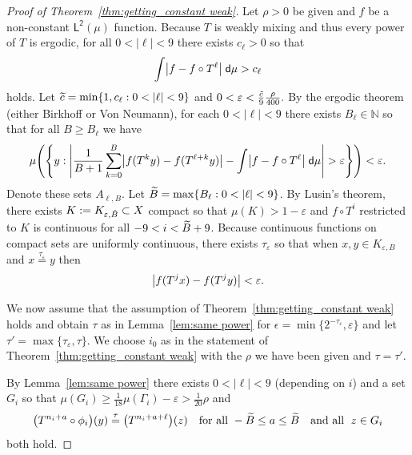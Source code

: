 \documentclass[10pt]{amsart}
\theoremstyle{definition}\newtheorem{defi}[theo]{Definition}\newtheorem{rema}[theo]{Remark}\newtheorem{exam}[theo]{Example}\newtheorem{exem}[theo]{Example}\newtheorem{nota}[theo]{Notation}
\newcommand{\N}{\mathbb{N}}
\newcommand{\intd}{\;\mathsf{d}}
\newcommand{\lp}{\mathsf{L}}
\newcommand{\ltwo}{\lp^{\!\mathsf{2}}}
\let\originalleft\left
\let\originalright\right
\renewcommand{\left}{\mathopen{}\mathclose\bgroup\originalleft}
\renewcommand{\right}{\aftergroup\egroup\originalright}
\let\oldtilde\tilde
\renewcommand*{\tilde}[1]{\mathchoice{\widetilde{#1}}{\widetilde{#1}}{\oldtilde{#1}}{\oldtilde{#1}}}
\begin{document}
\begin{proof}[Proof of Theorem~\ref{thm:getting_constant weak}]
Let $\rho>0$ be given and $f$ be a non-constant $\ltwo(\mu)$ function. Because $T$ is weakly mixing and thus every power of $T$ is ergodic, for all $0<|\ell|<9$ there exists $c_\ell>0$ so that
\[
\int \left|f-f\circ T^\ell\right| \intd \mu>c_\ell
\]
holds. Let $\tilde{c}=\min\{1,c_\ell:0<|\ell|<9\}$ and $0<\varepsilon<\frac{\tilde{c}}9 \frac{\rho}{400}.$ By the ergodic theorem (either Birkhoff or Von Neumann), for each $0<|\ell|<9$ there exists $B_\ell \in \N$ so that for all $B\geq B_\ell$ we have
\begin{equation}\label{eq:erg}
\mu \left(\left\{ y : \left|\frac 1 {B+1} \sum_{k=0}^{B} \left|f(T^{k}y)-f(T^{\ell+k}y)\right|-\int\left|f-f \circ T^{\ell}\right| \intd\mu\right|>\varepsilon\right\} \right) < \varepsilon.
\end{equation}
Denote these sets $A_{\ell,B}$. Let $\tilde{B}=\max\{B_\ell:0<|\ell|<9\}$. By Lusin's theorem, there exists $K:=K_{\varepsilon,\tilde{B}}\subset X$ compact so that $\mu(K)>1-\varepsilon$ and $f\circ T^i$ restricted to $K$ is continuous for all $-9<i<\tilde{B}+9$. Because continuous functions on compact sets are uniformly continuous, there exists $\tau_{\varepsilon}$ so that when $x,y \in K_{\varepsilon,B}$ and $x \overset{\tau_{\varepsilon}}{=} y$ then
\begin{equation}\label{eq:all close}
\left|f(T^jx)-f(T^jy)\right|<\varepsilon.
\end{equation}


We now assume that the assumption of Theorem~\ref{thm:getting_constant weak} holds and obtain $\tau$ as in Lemma~\ref{lem:same power} for $\epsilon=\min\{2^{-\tau_{\varepsilon}},\varepsilon\}$ and let $\tau'=\max\{\tau_{\varepsilon},\tau\}.$ We choose $i_0$ as in the statement of Theorem~\ref{thm:getting_constant weak} with the $\rho$ we have been given and $\tau=\tau'$.

By Lemma~\ref{lem:same power} there exists $0<|\ell|<9$ (depending on $i$) and a set $G_i$ so that $\mu(G_i)\geq \frac 1 {18}\mu(\Gamma_i)-\varepsilon>\frac{1}{20} \rho$ and
\begin{equation}\label{eq:specific ell}
\left(T^{n_i+a} \circ \phi_i\right)(y) \overset{\tau}{=} \left(T^{n_i+a+\ell}\right)(z)\quad
\text{for all } -\tilde{B}\leq a \leq \tilde{B} \quad\text{and all }\; z \in G_i
\end{equation}
both hold.


\end{proof}
\end{document}
